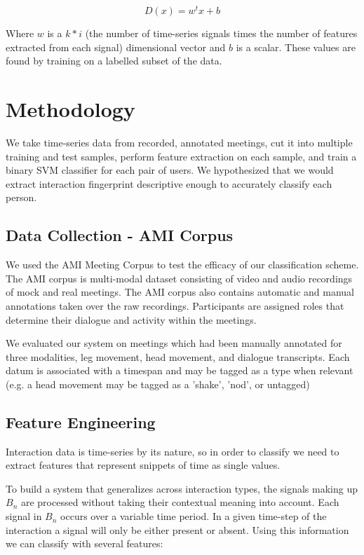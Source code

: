 \documentclass[conference]{IEEEtran}
\begin{document}
\begin{equation}
    D(x) = w^tx + b
\end{equation}

Where $w$ is a $k*i$ (the number of time-series signals times the number of features extracted from each signal) dimensional vector and $b$ is a scalar. These values are found by training on a labelled subset of the data. 


\section{Methodology}
We take time-series data from recorded, annotated meetings, cut it into multiple training and test samples, perform feature extraction on each sample, and train a binary SVM classifier for each pair of users. We hypothesized that we would extract interaction fingerprint descriptive enough to accurately classify each person. 


\subsection{Data Collection - AMI Corpus}
We used the AMI Meeting Corpus \cite{kilgour_ami_nodate} to test the efficacy of our classification scheme. The AMI corpus is multi-modal dataset consisting of video and audio recordings of mock and real meetings. The AMI corpus also contains automatic and manual annotations taken over the raw recordings. Participants are assigned roles that determine their dialogue and activity within the meetings.

We evaluated our system on meetings which had been manually annotated for three modalities, leg movement, head movement, and dialogue transcripts. Each datum is associated with a timespan and may be tagged as a type when relevant (e.g. a head movement may be tagged as a 'shake', 'nod', or untagged)

\subsection{Feature Engineering}\label{feature_engineering}
Interaction data is time-series by its nature, so in order to classify we need to extract features that represent snippets of time as single values.  

To build a system that generalizes across interaction types, the signals making up $B_n$ are processed without taking their contextual meaning into account. Each signal in $B_n$ occurs over a variable time period. In a given time-step of the interaction a signal will only be either present or absent. Using this information we can classify with several features:
\end{document}
